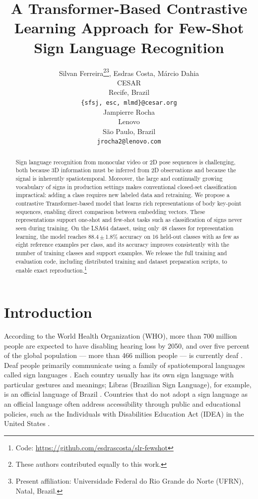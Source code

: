 \documentclass{article}
\title{A Transformer-Based Contrastive Learning Approach for Few-Shot Sign Language Recognition}
\author{
    \naturalfnmarks
    Silvan Ferreira\thanks{These authors contributed equally to this work.}\thanks{Present affiliation: Universidade Federal do Rio Grande do Norte (UFRN), Natal, Brazil.}, Esdras Costa\footnotemark[1], M\'arcio Dahia \\
    CESAR \\
    Recife, Brazil \\
    \texttt{\{sfsj, esc, mlmd\}@cesar.org} \\
    \And
    Jampierre Rocha \\
    Lenovo \\
    S\~ao Paulo, Brazil \\
    \texttt{jrocha2@lenovo.com} \\
}
\begin{document}
\maketitle

\begin{abstract}
Sign language recognition from monocular video or 2D pose sequences is challenging, both because 3D information must be inferred from 2D observations and because the signal is inherently spatiotemporal. Moreover, the large and continually growing vocabulary of signs in production settings makes conventional closed-set classification impractical: adding a class requires new labeled data and retraining. We propose a contrastive Transformer-based model that learns rich representations of body key-point sequences, enabling direct comparison between embedding vectors. These representations support one-shot and few-shot tasks such as classification of signs never seen during training. On the LSA64 dataset, using only 48 classes for representation learning, the model reaches 88.4\,$\pm$\,1.8\% accuracy on 16 held-out classes with as few as eight reference examples per class, and its accuracy improves consistently with the number of training classes and support examples. We release the full training and evaluation code, including distributed training and dataset preparation scripts, to enable exact reproduction.\footnote{Code: \url{https://github.com/esdrascosta/slr-fewshot}}
\end{abstract}


\section{Introduction}
\label{section:intro}
According to the World Health Organization (WHO), more than 700 million people are expected to have disabling hearing loss by 2050, and over five percent of the global population --- more than 466 million people --- is currently deaf \cite{world2021world}. Deaf people primarily communicate using a family of spatiotemporal languages called sign languages \cite{world2021world}. Each country usually has its own sign language with particular gestures and meanings; Libras (Brazilian Sign Language), for example, is an official language of Brazil \cite{de2012linguistic}. Countries that do not adopt a sign language as an official language often address accessibility through public and educational policies, such as the Individuals with Disabilities Education Act (IDEA) in the United States \cite{schwartz2022falling}.
\end{document}
